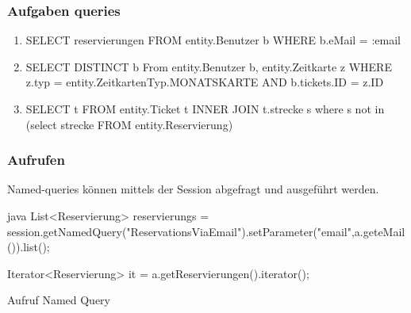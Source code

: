 	\subsubsection{Aufgaben queries}
	
	\begin{enumerate}
		\item SELECT reservierungen FROM entity.Benutzer b WHERE b.eMail = :email
		\item SELECT DISTINCT b From entity.Benutzer b, entity.Zeitkarte z WHERE z.typ = entity.ZeitkartenTyp.MONATSKARTE AND b.tickets.ID = z.ID
		\item SELECT t FROM entity.Ticket t INNER JOIN t.strecke s where s not in (select strecke FROM entity.Reservierung)
	\end{enumerate}
	
	\subsubsection{Aufrufen}
		Named-queries können mittels der Session abgefragt und ausgeführt werden.
		
		
	\begin{listing}
	\begin{code}[]{java}
		List<Reservierung> reservierungs = session.getNamedQuery("ReservationsViaEmail").setParameter("email",a.geteMail()).list();
		
		Iterator<Reservierung> it = a.getReservierungen().iterator();	
	\end{code}

	\caption{Aufruf Named Query}
	\end{listing}


	
